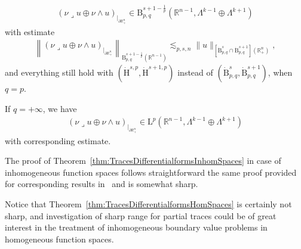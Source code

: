 \documentclass[AHL,Unicode,longabstracts,published]{cedram}
\newcommand{\bbR}{\mathbb{R}}
\newcommand{\rmH}{\mathrm{H}}%
\newcommand{\rmB}{\mathrm{B}}
\newcommand{\rmL}{\mathrm{L}}
\newcommand{\iprod}{\mathbin{\lrcorner}}
\begin{document}
\begin{theo}
\begin{enumerate}
\begin{align*}
\left(\nu\iprod u\oplus\nu\wedge u\right)_{|_{\partial\bbR^n_+}}\in \rmB^{s+1-\frac{1}{p}}_{p,q} \left(\bbR^{n-1},\Lambda^{k-1}\oplus\Lambda^{k+1}\right)
\end{align*}
with estimate
\begin{align*}
\left\| \left(\nu\iprod u\oplus\nu\wedge u\right)_{|_{\partial\bbR^n_+}} \right\|_{\rmB^{s+1-\frac{1}{p}}_{p,q}\left(\bbR^{n-1}\right)} \lesssim_{p,s,n} \| u \|_{\left[{\dot{\rmB}}^{s}_{p,q}\cap{\dot{\rmB}}^{s+1}_{p,q}\right]\left(\bbR^n_+\right)},
\end{align*}
and everything still hold with $({\dot{\rmH}}^{s,p},{\dot{\rmH}}^{s+1,p})$ instead of $(\dot{\rmB}^{s}_{p,q},\dot{\rmB}^{s+1}_{p,q})$, when $q=p$.

If $q=+\infty$, we have
\begin{align*}
(\nu\iprod u\oplus\nu\wedge u)_{|_{\partial\bbR^n_+}}\in \rmL^{p} \left(\bbR^{n-1},\Lambda^{k-1}\oplus\Lambda^{k+1}\right)
\end{align*}
with corresponding estimate.
\end{enumerate}
\end{theo}

\begin{rema}
The proof of Theorem~\ref{thm:TracesDifferentialformsInhomSpaces} in case of inhomogeneous function spaces follows straightforward the same proof provided for corresponding results in~\cite[Section~4]{MitreaMitreaShaw2008} and is somewhat sharp.

Notice that Theorem~\ref{thm:TracesDifferentialformsHomSpaces} is certainly not sharp, and investigation of sharp range for partial traces could be of great interest in the treatment of inhomogeneous boundary value problems in homogeneous function spaces.
\end{rema}
\end{document}
